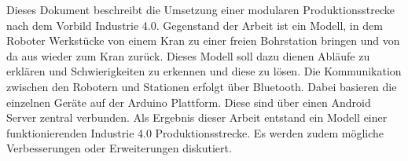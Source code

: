 
Dieses Dokument beschreibt die Umsetzung einer modularen Produktionsstrecke nach dem Vorbild Industrie 4.0.
Gegenstand der Arbeit ist ein Modell, in dem Roboter Werkstücke
von einem Kran zu einer freien Bohrstation bringen und von da aus wieder zum Kran zurück. Dieses Modell soll dazu dienen Abläufe zu erklären und Schwierigkeiten zu erkennen und diese zu lösen.
Die Kommunikation zwischen den Robotern und Stationen erfolgt über Bluetooth. Dabei basieren die einzelnen Geräte auf der Arduino Plattform. Diese sind über einen Android Server zentral verbunden.
Als Ergebnis dieser Arbeit entstand ein Modell einer funktionierenden Industrie 4.0 Produktionsstrecke. Es werden zudem mögliche Verbesserungen oder Erweiterungen diskutiert.
